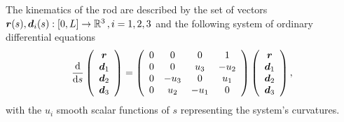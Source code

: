 \documentclass[a4paper,12pt]{article}
\begin{document}
The kinematics of the rod  are described by the set of vectors $\v{r}(s),\v{d}_i(s):[0,L]\rightarrow \mathbb{R}^3\,,i=1,2,3$ and the following system of ordinary differential equations
\begin{equation*}
\label{fullkinematics}
\fd{}{s}
\left(\begin{array}{c} \v{r} \\ \v{d}_1 \\\v{d}_2\\ \v{d}_3 \end{array}\right) = 
\left(\begin{array}{cccc}
0 &0 & 0 & 1 \\
0 & 0 &  u_3 & -u_2\\
0 & -u_3 &  0 & u_1\\
0 & u_2 &  -u_1 & 0
\end{array}\right)
\left(\begin{array}{c}\v{r}\\ \v{d}_1 \\ \v{d}_2 \\ \v{d}_3 \end{array}\right),
\end{equation*}
with the $u_i$ smooth scalar functions of $s$ representing the system's curvatures.
\end{document}
